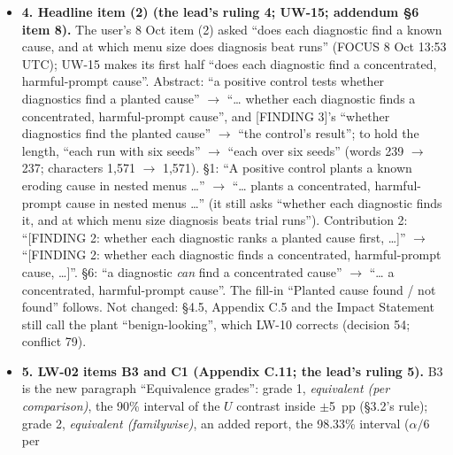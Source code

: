 \documentclass{article}
\theoremstyle{plain}
\theoremstyle{definition}
\theoremstyle{remark}
\begin{document}
\begin{itemize}
        same mean for OLMo-2-1B (the mean of its three Gate A seeds' $E$; the
        consistency review), so $\delta$ is the same share of each family's
        erosion; with the consolidated list's worked values (2.2~pp at
        $E_{\mathrm{fam}} = 20$ pp, 6.1~pp at 55~pp), ``fixed before its stage-2
        runs'' (DRAFT \S{}4.2, AMD C2) and the absolute 5~pp reported beside it.
        C1's wording sits in Appendix C.11 only, so the body states no Gate A
        number (conflict 81).
  \item \textbf{4. Headline item (2) (the lead's ruling 4; UW-15; addendum \S{}6
        item 8).} The user's 8 Oct item (2) asked ``does each diagnostic find a
        known cause, and at which menu size does diagnosis beat runs'' (FOCUS 8
        Oct 13:53 UTC); UW-15 makes its first half ``does each diagnostic find a
        concentrated, harmful-prompt cause''. Abstract: ``a positive control
        tests whether diagnostics find a planted cause'' $\to$ ``\ldots{}
        whether each diagnostic finds a concentrated, harmful-prompt cause'',
        and [FINDING 3]'s ``whether diagnostics find the planted cause'' $\to$
        ``the control's result''; to hold the length, ``each run with six
        seeds'' $\to$ ``each over six seeds'' (words 239 $\to$ 237; characters
        1,571 $\to$ 1,571). \S{}1: ``A positive control plants a known eroding
        cause in nested menus \ldots{}'' $\to$ ``\ldots{} plants a concentrated,
        harmful-prompt cause in nested menus \ldots{}'' (it still asks ``whether
        each diagnostic finds it, and at which menu size diagnosis beats trial
        runs''). Contribution 2: ``[FINDING 2: whether each diagnostic ranks a
        planted cause first, \ldots{}]'' $\to$ ``[FINDING 2: whether each
        diagnostic finds a concentrated, harmful-prompt cause, \ldots{}]''.
        \S{}6: ``a diagnostic \emph{can} find a concentrated cause'' $\to$
        ``\ldots{} a concentrated, harmful-prompt cause''. The fill-in ``Planted
        cause found / not found'' follows. Not changed: \S{}4.5, Appendix C.5
        and the Impact Statement still call the plant ``benign-looking'', which
        LW-10 corrects (decision 54; conflict 79).
  \item \textbf{5. LW-02 items B3 and C1 (Appendix C.11; the lead's ruling 5).}
        B3 is the new paragraph ``Equivalence grades'': grade 1,
        \emph{equivalent (per comparison)}, the 90\% interval of the $U$
        contrast inside $\pm$5~pp (\S{}3.2's rule); grade 2, \emph{equivalent
        (familywise)}, an added report, the 98.33\% interval ($\alpha/6$ per

\end{itemize}
\end{document}
